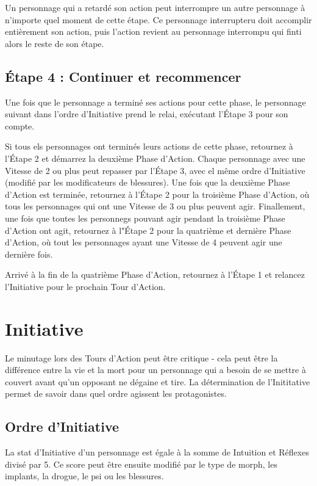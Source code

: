 Un personnage qui a retardé son action peut interrompre un autre personnage à n'importe quel moment de cette étape. Ce personnage interrupteru doit accomplir entièrement son action, puis l'action revient au personnage interrompu qui finti alors le reste de son étape. 

\subsection{Étape 4 : Continuer et recommencer} \label{sec:rotate-repeat} 

Une fois que le personnage a terminé ses actions pour cette phase, le personnage suivant dans l'ordre d'Initiative prend le relai, exécutant l'Étape 3 pour son compte. 

Si tous els personnages ont terminés leurs actions de cette phase, retournez à l'Étape 2 et démarrez la deuxième Phase d'Action. Chaque personnage avec une Vitesse de 2 ou plus peut repasser par l'Étape 3, avec el même ordre d'Initiative (modifié par les modificateurs de blessures). Une fois que la deuxième Phase d'Action est terminée, retournez à l'Étape 2 pour la troisième Phase d'Action, où tous les personnages qui ont une Vitesse de 3 ou plus peuvent agir. Finallement, une fois que toutes les personnegs pouvant agir pendant la troisième Phase d'Action ont agit, retournez à l"Étape 2 pour la quatrième et dernière Phase d'Action, où tout les personnages ayant une Vitesse de 4 peuvent agir une dernière fois. 

Arrivé à la fin de la quatrième Phase d'Action, retournez à l'Étape 1 et relancez l'Initiative pour le prochain Tour d'Action. 

\section{Initiative} \label{sec:initiative} 

Le minutage lors des Tours d'Action peut être critique - cela peut être la différence entre la vie et la mort pour un personnage qui a besoin de se mettre à couvert avant qu'un opposant ne dégaine et tire. La détermination de l'Inititative permet de savoir dans quel ordre agissent les protagonistes. 

\subsection{Ordre d'Initiative} \label{sec:initiative-order} 

La stat d'Initiative d'un personnage est égale à la somme de Intuition et Réflexes divisé par 5. Ce score peut être ensuite modifié par le type de morph, les implants, la drogue, le psi ou les blessures. 

